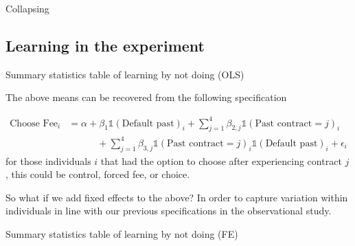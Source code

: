 \documentclass[oneside,11pt]{article}
\begin{document}



\begin{table}[H]
\caption{Collapsing}
\begin{center}
\scriptsize{}
\end{center}
 \scriptsize

\end{table}








\subsection{Learning in the experiment}


\begin{table}[H]
\caption{Summary statistics table of learning by not doing (OLS)}
\begin{center}
\scriptsize{}
\end{center}
 \scriptsize

\end{table}
 
The above means can be recovered from the following specification

\begin{align*}
    \text{Choose Fee}_{i} &=  \alpha +  \beta_1\mathds{1}(\text{Default past})_{i} +\sum_{j=1}^{4}\beta_{2,j}\mathds{1}(\text{Past contract}=j)_{i} \\
   &\qquad\quad  +\sum_{j=1}^{4}\beta_{3,j}\mathds{1}(\text{Past contract}=j)_{i}\mathds{1}(\text{Default past})_{i} + \epsilon_i
\end{align*}
for those individuals $i$ that had the option to choose after experiencing contract $j$, this could be control, forced fee, or choice. 

So what if we add fixed effects to the above? In order to capture variation within individuals in line with our previous specifications in the observational study.




\begin{table}[H]
\caption{Summary statistics table of learning by not doing (FE)}
\begin{center}
\scriptsize{}
\end{center}
 \scriptsize

\end{table}
\end{document}
